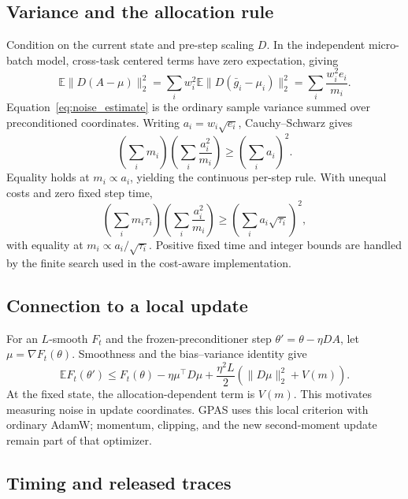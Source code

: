 \subsection{Variance and the allocation rule}
\label{app:allocation_proofs}

Condition on the current state and pre-step scaling $D$. In the
independent micro-batch model, cross-task centered terms have zero
expectation, giving
\begin{equation}
    \mathbb E\|D(A-\mu)\|_2^2
       =\sum_i w_i^2\mathbb E\|D(\bar g_i-\mu_i)\|_2^2
       =\sum_i\frac{w_i^2e_i}{m_i}.
\end{equation}
Equation~\ref{eq:noise_estimate} is the ordinary sample variance
summed over preconditioned coordinates.
Writing $a_i=w_i\sqrt{e_i}$, Cauchy--Schwarz gives
\begin{equation}
    \left(\sum_i m_i\right)
    \left(\sum_i\frac{a_i^2}{m_i}\right)
    \geq\left(\sum_i a_i\right)^2.
\end{equation}
Equality holds at $m_i\propto a_i$, yielding the continuous
per-step rule. With unequal costs and zero fixed step time,
\begin{equation}
    \left(\sum_i m_i\tau_i\right)
    \left(\sum_i\frac{a_i^2}{m_i}\right)
    \geq\left(\sum_i a_i\sqrt{\tau_i}\right)^2,
\end{equation}
with equality at $m_i\propto a_i/\sqrt{\tau_i}$.
Positive fixed time and integer bounds are handled by the finite
search used in the cost-aware implementation.

\subsection{Connection to a local update}
\label{app:descent}

For an $L$-smooth $F_t$ and the frozen-preconditioner step
$\theta'=\theta-\eta DA$, let $\mu=\nabla F_t(\theta)$.
Smoothness and the bias--variance identity give
\begin{equation}
    \mathbb E F_t(\theta')
       \leq F_t(\theta)-\eta\mu^\top D\mu
       +\frac{\eta^2L}{2}
         \left(\|D\mu\|_2^2+V(m)\right).
\end{equation}
At the fixed state, the allocation-dependent term is $V(m)$.
This motivates measuring noise in update coordinates. GPAS uses
this local criterion with ordinary AdamW; momentum, clipping, and
the new second-moment update remain part of that optimizer.

\subsection{Timing and released traces}
\label{app:system_details}

